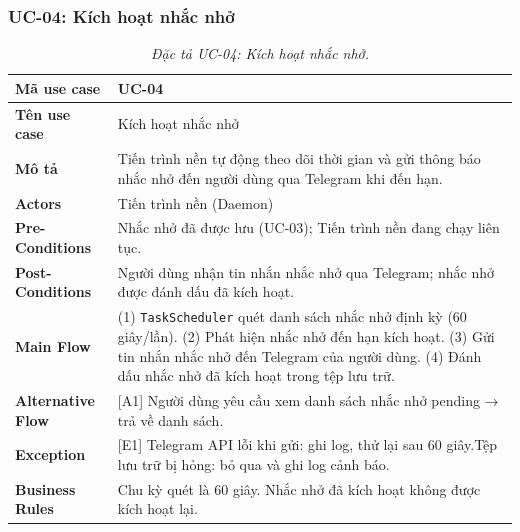 \subsubsection{UC-04: Kích hoạt nhắc nhở}
\label{subsec:spec-uc04}
\renewcommand{\arraystretch}{1.4}
\begin{longtable}{|>{\bfseries}p{3.5cm}|p{10.5cm}|}
  \caption{\emph{Đặc tả UC-04: Kích hoạt nhắc nhở.}} \label{tab:spec-uc04} \\
  \hline
  Mã use case      & UC-04 \\ \hline
  Tên use case     & Kích hoạt nhắc nhở \\ \hline
  Mô tả            & Tiến trình nền tự động theo dõi thời gian và gửi thông báo nhắc nhở đến người dùng qua Telegram khi đến hạn. \\ \hline
  Actors           & Tiến trình nền (Daemon) \\ \hline
  Pre-Conditions   & Nhắc nhở đã được lưu (UC-03); Tiến trình nền đang chạy liên tục. \\ \hline
  Post-Conditions  & Người dùng nhận tin nhắn nhắc nhở qua Telegram; nhắc nhở được đánh dấu đã kích hoạt. \\ \hline
  Main Flow        & (1) \texttt{TaskScheduler} quét danh sách nhắc nhở định kỳ (60 giây/lần).\newline
                     (2) Phát hiện nhắc nhở đến hạn kích hoạt.\newline
                     (3) Gửi tin nhắn nhắc nhở đến Telegram của người dùng.\newline
                     (4) Đánh dấu nhắc nhở đã kích hoạt trong tệp lưu trữ. \\ \hline
  Alternative Flow & [A1] Người dùng yêu cầu xem danh sách nhắc nhở pending → trả về danh sách. \\ \hline
  Exception        & [E1] Telegram API lỗi khi gửi: ghi log, thử lại sau 60 giây.\newline
                     [E2] Tệp lưu trữ bị hỏng: bỏ qua và ghi log cảnh báo. \\ \hline
  Business Rules   & Chu kỳ quét là 60 giây.\newline
                     Nhắc nhở đã kích hoạt không được kích hoạt lại. \\ \hline
\end{longtable}

